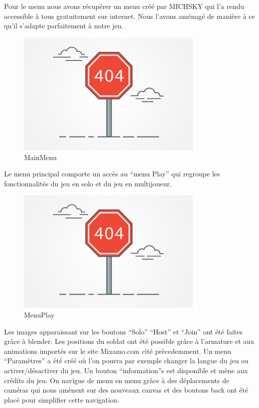 \documentclass[12pt]{report}
\begin{document}
Pour le menu nous avons récupérer un menu créé par MICHSKY qui l’a rendu accessible à tous gratuitement sur internet. Nous l’avons aménagé de manière à ce qu’il s’adapte parfaitement à notre jeu.

\begin{figure}[H]
    \centering
    \includegraphics[width=0.8\textwidth]{404}
    \caption{MainMenu}
\end{figure}

 Le menu principal comporte un accès au “menu Play” qui regroupe les fonctionnalités du jeu en solo et du jeu en multijoueur.

\begin{figure}[H]
    \centering
    \includegraphics[width=0.8\textwidth]{404}
    \caption{MenuPlay}
\end{figure}

 Les images apparaissant sur les boutons “Solo” “Host” et “Join” ont été faites grâce à blender. Les positions du soldat ont été possible grâce à l’armature et aux animations importés sur le site Mixamo.com cité prècedemment. Un menu “Paramètres” a été créé où l’on pourra par exemple changer la langue du jeu ou activer/désactiver du jeu. Un bouton “information”s est disponible et mène aux crédits du jeu.  On navigue de menu en menu grâce à des déplacements de caméras qui nous amènent sur des nouveaux canvas et des boutons back ont été placé pour simplifier cette navigation.
\end{document}
